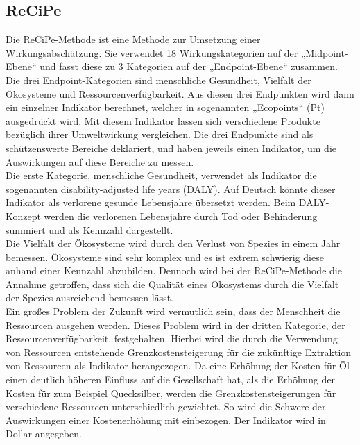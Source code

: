 \documentclass[12pt]{article}
\begin{document}
\subsection{ReCiPe}
Die ReCiPe-Methode ist eine Methode zur Umsetzung einer Wirkungsabschätzung. Sie verwendet 18 Wirkungskategorien auf der „Midpoint-Ebene“ und fasst diese zu 3 Kategorien auf der „Endpoint-Ebene“ zusammen. Die drei Endpoint-Kategorien sind menschliche Gesundheit, Vielfalt der Ökosysteme und Ressourcenverfügbarkeit. Aus diesen drei Endpunkten wird dann ein einzelner Indikator berechnet, welcher in sogenannten „Ecopoints“ (Pt) ausgedrückt wird. Mit diesem Indikator lassen sich verschiedene Produkte bezüglich ihrer Umweltwirkung vergleichen.
Die drei Endpunkte sind als schützenswerte Bereiche deklariert, und haben jeweils einen Indikator, um die Auswirkungen auf diese Bereiche zu messen.\\
Die erste Kategorie, menschliche Gesundheit, verwendet als Indikator die sogenannten disability-adjusted life years (DALY). Auf Deutsch könnte dieser Indikator als verlorene gesunde Lebensjahre übersetzt werden. Beim DALY-Konzept werden die verlorenen Lebensjahre durch Tod oder Behinderung summiert und als Kennzahl dargestellt.\\
Die Vielfalt der Ökosysteme wird durch den Verlust von Spezies in einem Jahr bemessen. Ökosysteme sind sehr komplex und es ist extrem schwierig diese anhand einer Kennzahl abzubilden. Dennoch wird bei der ReCiPe-Methode die Annahme getroffen, dass sich die Qualität eines Ökosystems durch die Vielfalt der Spezies ausreichend bemessen lässt.\\
Ein großes Problem der Zukunft wird vermutlich sein, dass der Menschheit die Ressourcen ausgehen werden. Dieses Problem wird in der dritten Kategorie, der Ressourcenverfügbarkeit, festgehalten. Hierbei wird die durch die Verwendung von Ressourcen entstehende Grenzkostensteigerung für die zukünftige Extraktion von Ressourcen als Indikator herangezogen. Da eine Erhöhung der Kosten für Öl einen deutlich höheren Einfluss auf die Gesellschaft hat, als die Erhöhung der Kosten für zum Beispiel Quecksilber, werden die Grenzkostensteigerungen für verschiedene Ressourcen unterschiedlich gewichtet. So wird die Schwere der Auswirkungen einer Kostenerhöhung mit einbezogen. Der Indikator wird in Dollar angegeben.
\FloatBarrier
\end{document}
